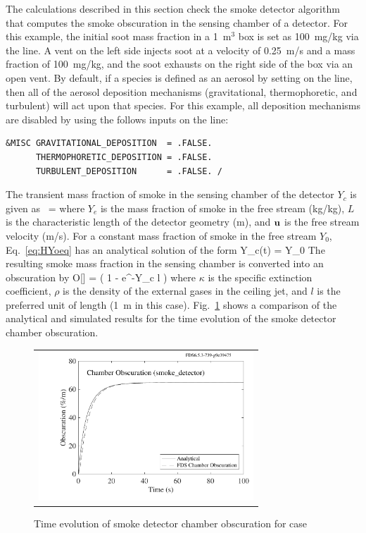 \documentclass[11pt]{book}
\begin{document}
The calculations described in this section check the smoke detector algorithm that computes the smoke obscuration in the sensing chamber of a detector. For this example, the initial soot mass fraction in a 1~m$^3$ box is set as 100~mg/kg via the  line. A vent on the left side injects soot at a velocity of 0.25~m/s and a mass fraction of 100~mg/kg, and the soot exhausts on the right side of the box via an open vent. By default, if a species is defined as an aerosol by setting  on the  line, then all of the aerosol deposition mechanisms (gravitational, thermophoretic, and turbulent) will act upon that species. For this example, all deposition mechanisms are disabled by using the follows inputs on the  line:

\begin{lstlisting}
&MISC GRAVITATIONAL_DEPOSITION  = .FALSE.
      THERMOPHORETIC_DEPOSITION = .FALSE.
      TURBULENT_DEPOSITION      = .FALSE. /
\end{lstlisting}

\noindent The transient mass fraction of smoke in the sensing chamber of the detector $Y_c$ is given as~\cite{FDS_Tech_Guide}
\be
{} =  \label{eq:HYoeq}
\ee
where $Y_e$ is the mass fraction of smoke in the free stream (kg/kg), $L$ is the characteristic length of the detector geometry (m), and ${\mathbf{u}}$ is the free stream velocity (m/s). For a constant mass fraction of smoke in the free stream $Y_0$, Eq.~\ref{eq:HYoeq} has an analytical solution of the form
\be
Y_c(t) = Y_0 
\ee
The resulting smoke mass fraction in the sensing chamber is converted into an obscuration by
\be
O[] = \left( 1 - e^{-\kappa \rho Y_c l} \right) 
\ee
where $\kappa$ is the specific extinction coefficient, $\rho$ is the density of the external gases in the ceiling jet,
and $l$ is the preferred unit of length (1~m in this case).
Fig.~\ref{fig:smoke_detector} shows a comparison of the analytical and simulated results for the time evolution of the smoke detector chamber obscuration.

\begin{figure}[ht]
\centering
\begin{tabular}{c}
\includegraphics[height=2.2in]{SCRIPT_FIGURES/smoke_detector}
\end{tabular}
\caption[Smoke detector chamber obscuration for  case]{Time evolution of smoke detector chamber obscuration for  case}
\label{fig:smoke_detector}
\end{figure}
\end{document}
